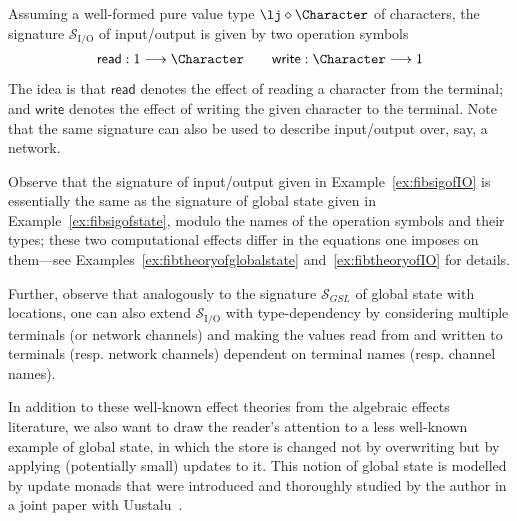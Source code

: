 \begin{example}
\label{ex:fibsigofIO}
Assuming a well-formed pure value type $\lj \diamond \Character$ of characters, the signature $\mathcal{S}_{\text{I/O}}$ of input/output is given by two operation symbols
\[
\mathsf{read} : 1 \longrightarrow \Character
\qquad
\mathsf{write} : \Character \longrightarrow 1
\]

The idea is that $\mathsf{read}$ denotes the effect of reading a character from the terminal; and $\mathsf{write}$ denotes the effect of writing the given character to the terminal. Note that the same signature can also be used to describe input/output over, say, a network.
\end{example}

Observe that the signature of input/output given in Example~\ref{ex:fibsigofIO} is essentially the same as the signature of global state given in Example~\ref{ex:fibsigofstate}, modulo the names of the operation symbols and their types; these two computational effects differ in the equations one  imposes on them---see Examples~\ref{ex:fibtheoryofglobalstate} and~\ref{ex:fibtheoryofIO} for details. 

Further, observe that analogously to the signature $\mathcal{S}_{GSL}$ of global state with locations, one can also extend $\mathcal{S}_{\text{I/O}}$ with type-dependency by considering multiple terminals (or network channels) and making the values read from and written to terminals (resp. network channels) dependent on terminal names (resp. channel names).

In addition to these well-known effect theories from the algebraic effects literature, we also want to draw the reader's attention to a less well-known example of global state, in which the store is changed not by overwriting but by applying (potentially small) updates to it. This notion of global state is modelled by   update monads that were introduced and thoroughly studied by the author in a joint paper with Uustalu~\cite{Ahman:UpdateMonads}. 

